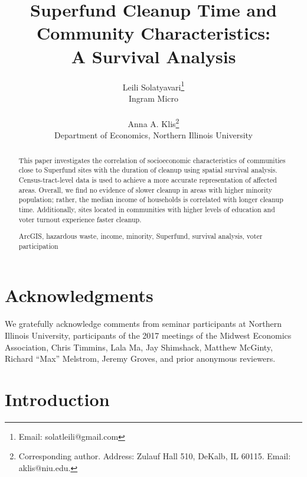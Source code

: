 \documentclass[12pt]{article}
\title{\Large Superfund Cleanup Time and Community Characteristics: \\
A Survival Analysis}
\author{\normalsize Leili Solatyavari\footnote{Email: solatleili@gmail.com} \\
\normalsize Ingram Micro \\ 
\\
\normalsize Anna A. Klis\footnote{Corresponding author. Address: Zulauf Hall 510, DeKalb, IL 60115. Email: aklis@niu.edu.} \\
\normalsize Department of Economics, Northern Illinois University \\
}
\date{ }
\begin{document}
\maketitle

\onehalfspacing

\vspace{-20pt}
\begin{abstract}
This paper investigates the correlation of socioeconomic characteristics of communities close to Superfund sites with the duration of cleanup using spatial survival analysis. Census-tract-level data is used to achieve a more accurate representation of affected areas. Overall, we find no evidence of slower cleanup in areas with higher minority population; rather, the median income of households is correlated with longer cleanup time. Additionally, sites located in communities with higher levels of education and voter turnout experience faster cleanup.

 ArcGIS, hazardous waste, income, minority, Superfund, survival analysis, voter participation

\end{abstract}

\section*{Acknowledgments}

{We gratefully acknowledge comments from seminar participants at Northern Illinois University, participants of the 2017 meetings of the Midwest Economics Association, Chris Timmins, Lala Ma, Jay Shimshack, Matthew McGinty, Richard ``Max'' Melstrom, Jeremy Groves, and prior anonymous reviewers.}





\newpage

\linenumbers
\section{Introduction}\label{intro}
\end{document}
